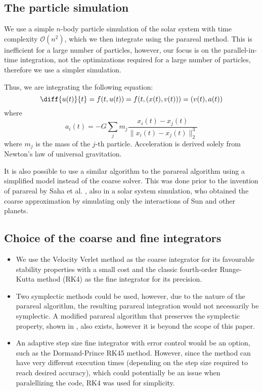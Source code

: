\documentclass[conference]{IEEEtran}
\begin{document}
\subsection{The particle simulation}
We use a simple $n$-body particle simulation of the solar system with time complexity $\mathcal{O}(n^2)$, which we then integrate using the parareal method. This is inefficient for a large number of particles, however, our focus is on the parallel-in-time integration, not the optimizations required for a large number of particles, therefore we use a simpler simulation.

Thus, we are integrating the following equation:
$$
\diff{u(t)}{t} = f(t, u(t)) = f(t, (x(t), v(t))) = (v(t), a(t))
$$
where 
$$
a_i(t) = -G \sum_j m_j\frac{x_i(t)-x_j(t)}{\|x_i(t)-x_j(t)\|_2^3}
$$
where $m_j$ is the mass of the $j$-th particle. Acceleration is derived solely from Newton's law of universal gravitation.

It is also possible to use a similar algorithm to the parareal algorithm using a simplified model instead of the coarse solver. This was done prior to the invention of parareal by Saha et al. \cite{parallelsolar}, also in a solar system simulation, who obtained the coarse approximation by simulating only the interactions of Sun and other planets. \cite{parallelsolar} \cite{farfuture}

\subsection{Choice of the coarse and fine integrators}
\begin{itemize}
    \item We use the Velocity Verlet method as the coarse integrator for its favourable stability properties with a small cost and the classic fourth-order Runge-Kutta method (RK4) as the fine integrator for its precision. \cite{integration}
    \item Two symplectic methods could be used, however, due to the nature of the parareal algorithm, the resulting parareal integration would not necessarily be symplectic. A modified parareal algorithm that preserves the symplectic property, shown in \cite{symplecticparareal}, also exists, however it is beyond the scope of this paper.
    \item An adaptive step size fine integrator with error control would be an option, such as the Dormand-Prince RK45 method. However, since the method can have very different execution times (depending on the step size required to reach desired accuracy), which could potentially be an issue when paralellizing the code, RK4 was used for simplicity.
\end{itemize}
\end{document}
